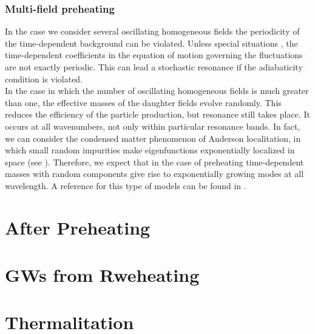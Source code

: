 \documentclass[11pt,a4paper,twoside]{book}
\begin{document}
\subsection{Multi-field preheating}
In the case we consider several oscillating homogeneous fields the periodicity of the time-dependent background can be violated. Unless special situations \cite{Chap4:Lozanov}, the time-dependent coefficients in the equation of motion governing the fluctuations are not exactly periodic. This can lead a stochastic resonance if the adiabaticity condition is violated. \\
In the case in which the number of oscillating homogeneous fields is much greater than one, the effective masses of the daughter fields evolve randomly. This reduces the efficiency of the particle production, but resonance still takes place. It occurs at all wavenumbers, not only within particular resonance bands. In fact, we can consider the condensed matter phenomenon of Anderson localitation, in which small random impurities make eigenfunctions exponentially localized in space (see \cite{Chap4:Lozanov}). Therefore, we expect that in the case of preheating time-dependent masses with random components give rise to exponentially growing modes at all wavelength. A reference for this type of models can  be found in \cite{Chap4:multifieldPreheating}.



\chapter{After Preheating}

\chapter{GWs from Rweheating}


\chapter{Thermalitation}
\end{document}
